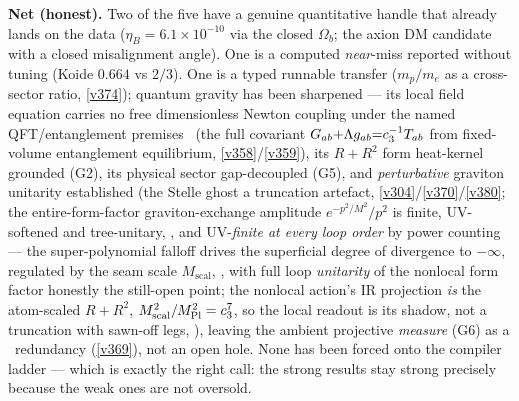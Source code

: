 \noindent\textbf{Net (honest).} Two of the five have a genuine quantitative handle that already lands on
the data ($\eta_B=6.1\times10^{-10}$ via the closed $\Omega_b$; the axion DM candidate with a closed
misalignment angle). One is a computed \emph{near}-miss reported without tuning (Koide $0.664$ vs $2/3$).
One is a typed runnable transfer ($m_p/m_e$ as a cross-sector ratio, \vref{v374}); quantum gravity has been
sharpened --- its local field equation carries no free dimensionless Newton coupling under the named QFT/entanglement premises \mC\ (the full covariant
$G_{ab}{+}\Lambda g_{ab}{=}c_3^{-1}T_{ab}$ from fixed-volume entanglement equilibrium, \vref{v358}/\vref{v359}),
its $R+R^2$ form heat-kernel grounded (G2), its physical sector gap-decoupled
(G5), and \emph{perturbative} graviton unitarity established (the Stelle ghost a truncation artefact,
\vref{v304}/\vref{v370}/\vref{v380}; the entire-form-factor graviton-exchange amplitude $e^{-p^2/M^2}/p^2$ is
finite, UV-softened and tree-unitary, , and UV-\emph{finite at every loop order} by
power counting --- the super-polynomial falloff drives the superficial degree of divergence to $-\infty$, regulated
by the seam scale $M_{\mathrm{scal}}$, , with full loop \emph{unitarity} of the
nonlocal form factor honestly the still-open point; the nonlocal action's IR projection \emph{is} the atom-scaled
$R+R^2$, $M_{\mathrm{scal}}^2/M_{\mathrm{Pl}}^2=c_3^7$, so the local readout is its shadow, not a truncation with sawn-off legs,
), leaving the ambient projective \emph{measure} (G6) as a \mC\ redundancy
(\vref{v369}), not an open hole. None has been
forced onto the compiler ladder --- which is exactly the right call: the strong results stay strong
precisely because the weak ones are not oversold.

